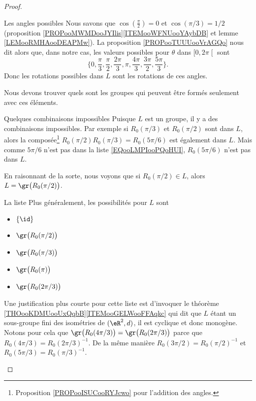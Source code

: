 \begin{proof}
\begin{subproof}
		\item[Les angles possibles]
		Nous savons que \( \cos(\frac{ \pi }{2})=0\) et \( \cos(\pi/3)=1/2\) (proposition \ref{PROPooMWMDooJYIlis}\ref{ITEMooWFNUooYAybDB} et lemme \ref{LEMooRMHAooDEAPMw}). La proposition \ref{PROPooTUUUooVrAGQo} nous dit alors que, dans notre cas, les valeurs possibles pour \( \theta\) dans \( \mathopen[ 0 , 2\pi \mathclose[\) sont
		\begin{equation}        \label{EQooLMPIooPQoHUI}
			\{ 0,\frac{ \pi }{ 3 },\frac{ \pi }{ 2 }, \frac{ 2\pi }{ 3 }, \pi,\frac{ 4\pi }{ 3 }, \frac{ 3\pi }{ 2 },\frac{ 5\pi }{ 3 } \}.
		\end{equation}
		Donc les rotations possibles dans \( L\) sont les rotations de ces angles.

		Nous devons trouver quels sont les groupes qui peuvent être formés seulement avec ces éléments.

		\item[Quelques combinaisons impossibles]
		Puisque \( L\) est un groupe, il y a des combinaisons impossibles. Par exemple si \( R_0(\pi/3)\) et \( R_0(\pi/2)\) sont dans \( L\), alors la composée\footnote{Proposition \ref{PROPooISUCooRYJcwo} pour l'addition des angles.} \( R_0(\pi/2)R_0(\pi/3)=R_0(5\pi/6)\) est également dans \( L\). Mais comme \( 5\pi/6\) n'est pas dans la liste \eqref{EQooLMPIooPQoHUI}, \( R_0(5\pi/6)\) n'est pas dans \( L\).

		En raisonnant de la sorte, nous voyons que si \( R_0(\pi/2)\in L\), alors \( L=\gr\big( R_0(\pi/2) \big)\).

		\item[La liste]
		Plus généralement, les possibilités pour \( L\) sont
		\begin{itemize}
			\item \( \{ \id \}\)
			\item \( \gr\big( R_0(\pi/2) \big)\)
			\item \( \gr\big( R_0(\pi/3) \big)\)
			\item \( \gr\big( R_0(\pi) \big)\)
			\item \( \gr\big( R_0(2\pi/3) \big)\)
		\end{itemize}
		Une justification plus courte pour cette liste est d'invoquer le théorème \ref{THOooKDMUooUxQqbB}\ref{ITEMooGELWooFFAqkc} qui dit que \( L\) étant un sous-groupe fini des isométries de \( (\eR^2,d)\), il est cyclique et donc monogène. Notons pour cela que \( \gr\big( R_0(4\pi/3) \big)=\gr\big( R_0(2\pi/3) \big)\) parce que \( R_0(4\pi/3)=R_0(2\pi/3)^{-1}\). De la même manière \( R_0(3\pi/2)=R_0(\pi/2)^{-1}\) et \( R_0(5\pi/3)=R_0(\pi/3)^{-1}\).


\end{subproof}
\end{proof}
